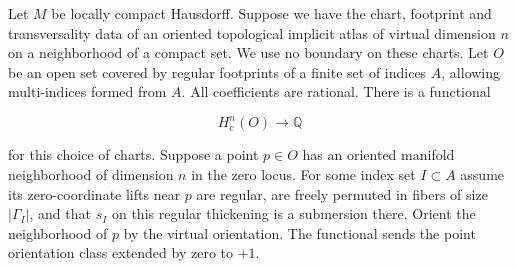 \begin{proposition}\label{prop:functional}
Let $M$ be locally compact Hausdorff. Suppose we have the chart,
footprint and transversality data of an oriented topological implicit
atlas of virtual dimension $n$ on a neighborhood of a compact set.
We use no boundary on these charts. Let $O$ be an open set covered
by regular footprints of a finite set of indices $A$, allowing
multi-indices formed from $A$. All coefficients are rational.
There is a functional

\[
                   H_c^n(O)\longrightarrow\mathbb Q
\]

for this choice of charts. Suppose a point $p\in O$ has an oriented
manifold neighborhood of dimension $n$ in the zero locus. For some
index set $I\subset A$ assume its zero-coordinate lifts near $p$
are regular, are freely permuted in fibers of size $|\Gamma_I|$,
and that $s_I$ on this regular thickening is a submersion there.
Orient the neighborhood of $p$ by the virtual orientation. The
functional sends the point orientation class extended by zero to
$+1$.
\end{proposition}
